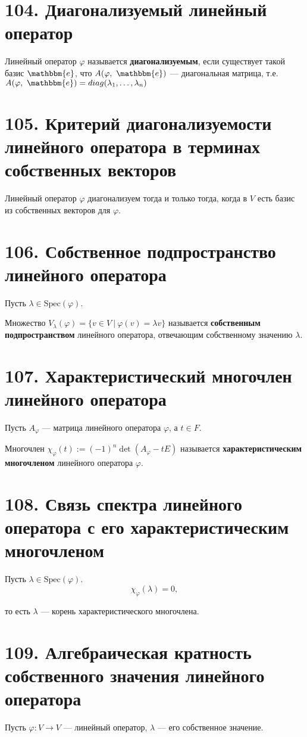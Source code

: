 \documentclass[a4paper, 12pt]{article}
\newcommand{\me}{\mathbbm{e}}
\begin{document}
\section*{104. Диагонализуемый линейный оператор}
Линейный оператор $\varphi$ называется \textbf{диагонализуемым}, если существует такой базис $\me$, что $A(\varphi,\ \me)$ --- диагональная матрица, т.е. $A(\varphi,\ \me) = diag(\lambda_1, \ldots, \lambda_n)$

\section*{105. Критерий диагонализуемости линейного оператора в терминах собственных векторов}
Линейный оператор $\varphi$ диагонализуем тогда и только тогда, когда в $V$ есть базис из собственных векторов для $\varphi$.

\section*{106. Собственное подпространство линейного оператора}
Пусть $\lambda \in \text{Spec}(\varphi)$.

Множество $V_\lambda(\varphi) = \{v \in V\ |\ \varphi(v) = \lambda v\}$ называется \textbf{собственным подпространством} линейного оператора, отвечающим собственному значению $\lambda$.

\section*{107. Характеристический многочлен линейного оператора}
Пусть $A_\varphi$ --- матрица линейного оператора $\varphi$, а $t \in F$.

Многочлен $\chi_\varphi(t) := (-1)^{n} \det (A_\varphi - t E)$ называется \textbf{характеристическим многочленом} линейного оператора $\varphi$.

\section*{108. Связь спектра линейного оператора с его характеристическим многочленом}
Пусть $\lambda \in \text{Spec}(\varphi)$.
\vspace{-2mm}
\[
\chi_\varphi(\lambda) = 0,
\]

то есть $\lambda$ --- корень характеристического многочлена.

\newpage
\section*{109. Алгебраическая кратность собственного значения линейного оператора}
Пусть $\varphi: V \rightarrow V$ --- линейный оператор, $\lambda$ --- его собственное значение.
\end{document}
